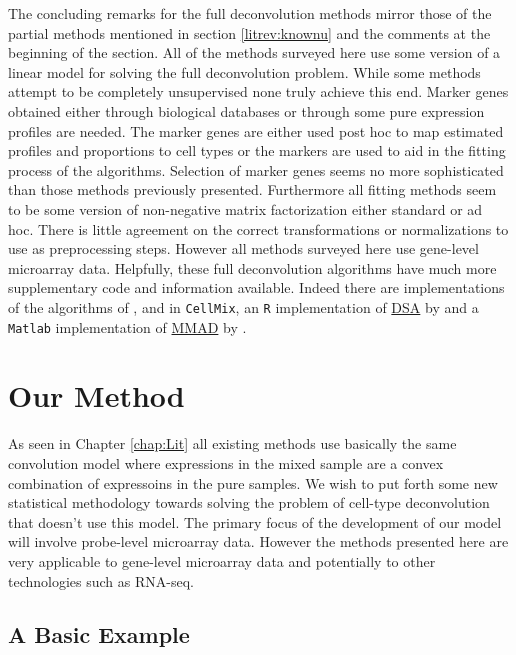 \documentclass[reqno,12pt,oneside]{report}\usepackage[]{graphicx}\usepackage[]{color}
\theoremstyle{plain}
\theoremstyle{definition}
\theoremstyle{remark}
\numberwithin{theorem}{chapter}     %
\begin{document}
The concluding remarks for the full deconvolution methods mirror those of the partial methods mentioned in section \ref{litrev:knownu} and the comments at the beginning of the section. All of the methods surveyed here use some version of a linear model for solving the full deconvolution problem. While some methods attempt to be completely unsupervised none truly achieve this end. Marker genes obtained either through biological databases or through some pure expression profiles are needed. The marker genes are either used post hoc to map estimated profiles and proportions to cell types or the markers are used to aid in the fitting process of the algorithms. Selection of marker genes seems no more sophisticated than those methods previously presented. Furthermore all fitting methods seem to be some version of non-negative matrix factorization either standard or ad hoc. There is little agreement on the correct transformations or normalizations to use as preprocessing steps. However all methods surveyed here use gene-level microarray data. Helpfully, these full deconvolution algorithms have much more supplementary code and information available. Indeed there are implementations of the algorithms of \citeauthor{Gaujoux2012}, and \citeauthor{Repsilber2010} in \verb+CellMix+, an \verb+R+ implementation of \href{https://github.com/zhandong/DSA}{DSA} by \citeauthor{Zhong2013} and a \verb+Matlab+ implementation of \href{https://sourceforge.net/projects/mmad/}{MMAD} by \citeauthor{Liebner2014}.



 \chapter{Our Method}
 \label{chap:Method}

As seen in Chapter \ref{chap:Lit} all existing methods use basically the same convolution model where expressions in the mixed sample are a convex combination of expressoins in the pure samples. We wish to put forth some new statistical methodology towards solving the problem of cell-type deconvolution that doesn't use this model. The primary focus of the development of our model will involve probe-level microarray data. However the methods presented here are very applicable to gene-level microarray data and potentially to other technologies such as RNA-seq. 

\section{A Basic Example}
\end{document}
